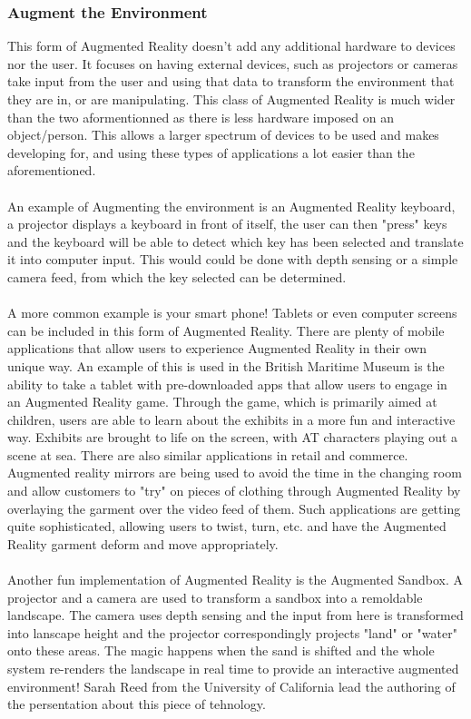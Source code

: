 \documentclass[11pt]{article}
\begin{document}
\subsubsection{Augment the Environment} 
This form of Augmented Reality doesn't add any additional hardware to devices nor the user.
It focuses on having external devices, such as projectors or cameras take 
input from the user and using that data to transform the environment that they 
are in, or are manipulating. This class of Augmented Reality is much wider than the two 
aformentionned as there is less hardware imposed on an object/person. This 
allows a larger spectrum of devices to be used and makes developing for,
and using these types of applications a lot easier than the aforementioned. \\
\\
An example of Augmenting the environment is an Augmented Reality keyboard, a projector displays
a keyboard in front of itself, the user can then "press" keys and
the keyboard will be able to detect which key has been selected and translate it 
into computer input. This would could be done with depth sensing or a
simple camera feed, from which the key selected can be determined.\\
\\
A more common example is your smart phone! Tablets or even computer screens 
can be included in this form of Augmented Reality. There are plenty of mobile applications that
allow users to experience Augmented Reality in their own unique way. An example of this is
used in the British Maritime Museum is the ability to take a tablet 
with pre-downloaded apps
that allow users to engage in an Augmented Reality game. Through the game, which is primarily
aimed at children, users are able to learn about the exhibits in a more fun and
interactive way. Exhibits are brought to life on the screen, with
AT characters playing out a scene at sea. 
There are also similar applications in retail and
commerce. Augmented reality mirrors are being used to avoid the time in the
changing room and allow customers to "try" on pieces of clothing through
Augmented Reality by overlaying the garment over the video feed of them. Such applications
are getting quite sophisticated, allowing users to twist, turn, etc. and
have the Augmented Reality garment deform and move appropriately.\\
\\
Another fun implementation of Augmented Reality is the Augmented Sandbox. A projector and
a camera are used to transform a sandbox into a remoldable landscape. The camera
uses depth sensing and the input from here is transformed into lanscape height
and the projector correspondingly projects "land" or "water" onto these areas.
The magic happens when the sand is shifted and the whole system re-renders the
landscape in real time to provide an interactive augmented environment! Sarah
Reed from the University of California lead the authoring of the persentation
about this piece of tehnology\cite{Reed14}.
\end{document}
